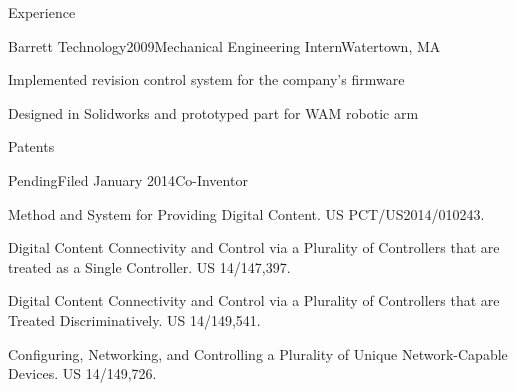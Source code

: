 \documentclass{resume}
\begin{document}
\begin{rSection}{Experience}
\begin{rSubsection}{Barrett Technology}{2009}{Mechanical Engineering Intern}{Watertown, MA}
\item Implemented revision control system for the company's firmware
\item Designed in Solidworks and prototyped part for WAM robotic arm
\end{rSubsection}


\end{rSection}

\begin{rSection}{Patents}
\begin{rSubsection}{Pending}{Filed January 2014}{Co-Inventor}{}
\item Method and System for Providing Digital Content. US PCT/US2014/010243.
\item Digital Content Connectivity and Control via a Plurality of Controllers that are treated as a Single Controller. US 14/147,397.
\item Digital Content Connectivity and Control via a Plurality of Controllers that are Treated Discriminatively. US 14/149,541.
\item Configuring, Networking, and Controlling a Plurality of Unique Network-Capable Devices. US 14/149,726.
\end{rSubsection}

\end{rSection}


\begin{comment}

\begin{rSection}{Activities}
\begin{rSubsection}{Track and Field}{2005-2013}{Pole Vault}{}
\item MIT Varsity, PR 4.85m (16 ft)
\item All-New England (DI, DII, and DIII)
\item 2-time New England DIII Champion
\end{rSubsection}

\begin{rSubsection}{Sigma Alpha Epsilon}{2009-2013}{Founding member, 1st President}{}
\item Nation-­wide Colony of the Year, 2-­time winner of MIT Service Cup, nation-wide Zeal Award winner, MIT Best New Member Program, and MIT Most Improved Chapter
\item Served as recruitment chair (60\% increase in membership in my officership), managed \$10,000 budget

\end{rSubsection}

\end{rSection}
\end{comment}
\end{document}

